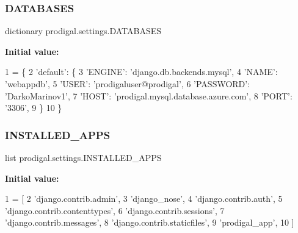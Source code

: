 \subsubsection{\texorpdfstring{D\+A\+T\+A\+B\+A\+S\+ES}{DATABASES}}
{\footnotesize\ttfamily dictionary prodigal.\+settings.\+D\+A\+T\+A\+B\+A\+S\+ES}

{\bfseries Initial value\+:}
\begin{DoxyCode}
1 =  \{
2     \textcolor{stringliteral}{'default'}: \{
3         \textcolor{stringliteral}{'ENGINE'}: \textcolor{stringliteral}{'django.db.backends.mysql'},
4         \textcolor{stringliteral}{'NAME'}: \textcolor{stringliteral}{'webappdb'},
5         \textcolor{stringliteral}{'USER'}: \textcolor{stringliteral}{'prodigaluser@prodigal'},
6         \textcolor{stringliteral}{'PASSWORD'}: \textcolor{stringliteral}{'DarkoMarinov1'},
7         \textcolor{stringliteral}{'HOST'}: \textcolor{stringliteral}{'prodigal.mysql.database.azure.com'},
8         \textcolor{stringliteral}{'PORT'}: \textcolor{stringliteral}{'3306'},
9     \}
10 \}
\end{DoxyCode}
\mbox{\label{namespaceprodigal_1_1settings_a5ce0f22c69dfb90dc8fbd1f892ce8209}} 
\subsubsection{\texorpdfstring{I\+N\+S\+T\+A\+L\+L\+E\+D\+\_\+\+A\+P\+PS}{INSTALLED\_APPS}}
{\footnotesize\ttfamily list prodigal.\+settings.\+I\+N\+S\+T\+A\+L\+L\+E\+D\+\_\+\+A\+P\+PS}

{\bfseries Initial value\+:}
\begin{DoxyCode}
1 =  [
2     \textcolor{stringliteral}{'django.contrib.admin'},
3     \textcolor{stringliteral}{'django\_nose'},
4     \textcolor{stringliteral}{'django.contrib.auth'},
5     \textcolor{stringliteral}{'django.contrib.contenttypes'},
6     \textcolor{stringliteral}{'django.contrib.sessions'},
7     \textcolor{stringliteral}{'django.contrib.messages'},
8     \textcolor{stringliteral}{'django.contrib.staticfiles'},
9     \textcolor{stringliteral}{'prodigal\_app'},
10 ]
\end{DoxyCode}
\mbox{\label{namespaceprodigal_1_1settings_af4c4f171c5606065ae8b19d192bce64e}} 
